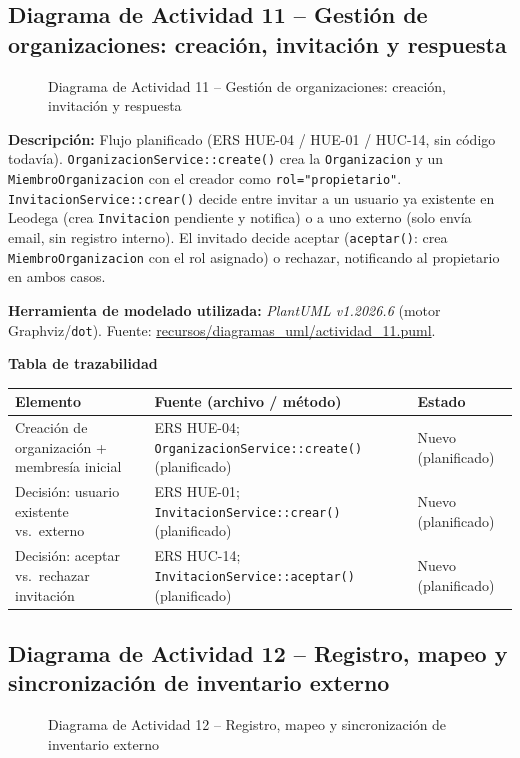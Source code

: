 \subsection{Diagrama de Actividad 11 -- Gestión de organizaciones: creación, invitación y respuesta}
\begin{figure}[H]
    \centering
    \caption{Diagrama de Actividad 11 -- Gestión de organizaciones: creación, invitación y respuesta}
    \label{fig:actividad11}
\end{figure}

{\sloppy\noindent\textbf{Descripción:} Flujo planificado (ERS HUE-04 / HUE-01 / HUC-14, sin código todavía). \texttt{OrganizacionService::create()} crea la \texttt{Organizacion} y un \texttt{MiembroOrganizacion} con el creador como \texttt{rol="propietario"}. \texttt{InvitacionService::crear()} decide entre invitar a un usuario ya existente en Leodega (crea \texttt{Invitacion} pendiente y notifica) o a uno externo (solo envía email, sin registro interno). El invitado decide aceptar (\texttt{aceptar()}: crea \texttt{MiembroOrganizacion} con el rol asignado) o rechazar, notificando al propietario en ambos casos.\par}

\bigskip
{\sloppy\noindent\textbf{Herramienta de modelado utilizada:} \textit{PlantUML v1.2026.6} (motor Graphviz/\texttt{dot}). Fuente: \url{recursos/diagramas_uml/actividad_11.puml}.\par}

\bigskip
\noindent\textbf{Tabla de trazabilidad}
\begin{longtable}{|L{4cm}|L{7.5cm}|M{2.3cm}|}
\hline
{} \textbf{Elemento} & \textbf{Fuente (archivo / método)} & \textbf{Estado} \\ \hline
\endhead
Creación de organización + membresía inicial & ERS HUE-04; \texttt{OrganizacionService::create()} (planificado) & Nuevo (planificado) \\ \hline
Decisión: usuario existente vs.\ externo & ERS HUE-01; \texttt{InvitacionService::crear()} (planificado) & Nuevo (planificado) \\ \hline
Decisión: aceptar vs.\ rechazar invitación & ERS HUC-14; \texttt{InvitacionService::aceptar()} (planificado) & Nuevo (planificado) \\ \hline
\end{longtable}
\clearpage

\subsection{Diagrama de Actividad 12 -- Registro, mapeo y sincronización de inventario externo}
\begin{figure}[H]
    \centering
    \caption{Diagrama de Actividad 12 -- Registro, mapeo y sincronización de inventario externo}
    \label{fig:actividad12}
\end{figure}

